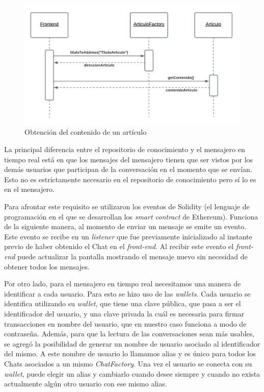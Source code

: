 \begin{figure}[H]
    \centering
    \includegraphics[width=0.75\linewidth]{img/ds-aw-eth-obtener-contenido-articulo.png}
    \caption{Obtención del contenido de un artículo}
    \label{fig:ds-aw-eth-obtener-contenido-articulo}
\end{figure}

La principal diferencia entre el repositorio de conocimiento y el mensajero en tiempo real está en que los mensajes del mensajero tienen que ser vistos por los demás usuarios que participan de la conversación en el momento que se envían. Esto no es estrictamente necesario en el repositorio de conocimiento pero sí lo es en el mensajero.

Para afrontar este requisito se utilizaron los eventos de Solidity (el lenguaje de programación en el que se desarrollan los \textit{smart contract} de Ethereum). Funciona de la siguiente manera, al momento de enviar un mensaje se emite un evento. Este evento se recibe en un \textit{listener} que fue previamente inicializado al instante previo de haber obtenido el Chat en el \textit{front-end}. Al recibir este evento el \textit{front-end} puede actualizar la pantalla mostrando el mensaje nuevo sin necesidad de obtener todos los mensajes.


Por otro lado, para el mensajero en tiempo real necesitamos una manera de identificar a cada usuario. Para esto se hizo uso de las \textit{wallets}. Cada usuario se identifica utilizando su \textit{wallet}, que tiene una clave pública, que pasa a ser el identificador del usuario, y una clave privada la cuál es necesaria para firmar transacciones en nombre del usuario, que en nuestro caso funciona a modo de contraseña. Además, para que la lectura de las conversaciones sean más usables, se agregó la posibilidad de generar un nombre de usuario asociado al identificador del mismo. A este nombre de usuario lo llamamos alias y es único para todos los Chats asociados a un mismo \textit{ChatFactory}. Una vez el usuario se conecta con su \textit{wallet}, puede elegir un alias y cambiarlo cuando desee siempre y cuando no exista actualmente algún otro usuario con ese mismo alias.

